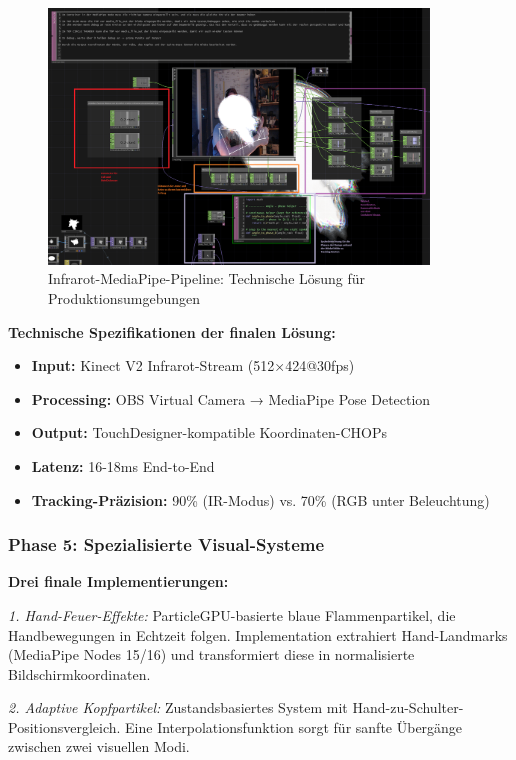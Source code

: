 \begin{figure}[H]
    \centering
    \includegraphics[width=0.9\textwidth]{images/docupictures/TopDown_KreisZuRampsParametisierteBerechnungen.png}
    \caption{Infrarot-MediaPipe-Pipeline: Technische Lösung für Produktionsumgebungen}
    \label{fig:infrared_solution}
\end{figure}

\textbf{Technische Spezifikationen der finalen Lösung:}
\begin{itemize}
    \item \textbf{Input:} Kinect V2 Infrarot-Stream (512×424@30fps)
    \item \textbf{Processing:} OBS Virtual Camera → MediaPipe Pose Detection
    \item \textbf{Output:} TouchDesigner-kompatible Koordinaten-CHOPs
    \item \textbf{Latenz:} 16-18ms End-to-End
    \item \textbf{Tracking-Präzision:} 90\% (IR-Modus) vs. 70\% (RGB unter Beleuchtung)
\end{itemize}

\subsubsection{Phase 5: Spezialisierte Visual-Systeme}

\textbf{Drei finale Implementierungen:}

\textit{1. Hand-Feuer-Effekte:}
ParticleGPU-basierte blaue Flammenpartikel, die Handbewegungen in Echtzeit folgen. Implementation extrahiert Hand-Landmarks (MediaPipe Nodes 15/16) und transformiert diese in normalisierte Bildschirmkoordinaten.

\textit{2. Adaptive Kopfpartikel:}
Zustandsbasiertes System mit Hand-zu-Schulter-Positionsvergleich. Eine Interpolationsfunktion sorgt für sanfte Übergänge zwischen zwei visuellen Modi.

